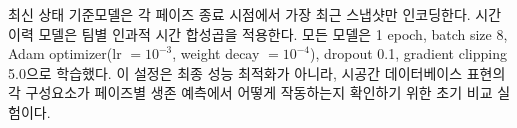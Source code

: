 최신 상태 기준모델은 각 페이즈 종료 시점에서 가장 최근 스냅샷만 인코딩한다. 시간
이력 모델은 팀별 인과적 시간 합성곱을 적용한다. 모든 모델은 1 epoch, batch size 8, Adam
optimizer(lr \(=10^{-3}\), weight decay \(=10^{-4}\)), dropout 0.1, gradient clipping
5.0으로 학습했다. 이 설정은 최종 성능 최적화가 아니라, 시공간 데이터베이스 표현의
각 구성요소가 페이즈별 생존 예측에서 어떻게 작동하는지 확인하기 위한 초기 비교
실험이다.
